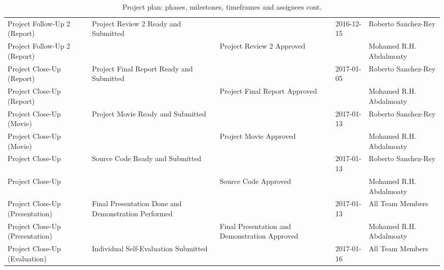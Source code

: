 \begin{landscape}
\begin{table}
    \begin{tabularx}{\linewidth}{l|X|X|X|X}
    Project Follow-Up 2 (Report)    & Project Review 2 Ready and Submitted                & ~                                             & 2016-12-15 & Roberto Sanchez-Rey                                      \\
    Project Follow-Up 2 (Report)    & ~                                                   & Project Review 2 Approved                     & ~          & Mohamed R.H. Abdalmoaty                                  \\ \hline
    Project Close-Up (Report)       & Project Final Report Ready and Submitted            & ~                                             & 2017-01-05 & Roberto Sanchez-Rey                                      \\
    Project Close-Up (Report)       & ~                                                   & Project Final Report  Approved                & ~          & Mohamed R.H. Abdalmoaty                                  \\
    Project Close-Up (Movie)        & Project Movie Ready and Submitted                   & ~                                             & 2017-01-13 & Roberto Sanchez-Rey                                      \\
    Project Close-Up (Movie)        & ~                                                   & Project Movie Approved                        & ~          & Mohamed R.H. Abdalmoaty                                  \\
    Project Close-Up                & Source Code Ready and Submitted                     & ~                                             & 2017-01-13 & Roberto Sanchez-Rey                                      \\
    Project Close-Up                & ~                                                   & Source Code Approved                          & ~          & Mohamed R.H. Abdalmoaty                                  \\ \hline
    Project Close-Up (Presentation) & Final Presentation Done and Demonstration Performed & ~                                             & 2017-01-13 & All Team Members                                         \\
    Project Close-Up (Presentation) & ~                                                   & Final Presentation and Demonstration Approved & ~          & Mohamed R.H. Abdalmoaty                                  \\ \hline
    Project Close-Up (Evaluation)   & Individual Self-Evaluation Submitted                & ~                                             & 2017-01-16 & All Team Members                                         \\
    \end{tabularx}
    \caption{Project plan: phases, milestones, timeframes and assignees cont.}
    \label{tbl:project_plan_2}
\end{table}
\end{landscape}
